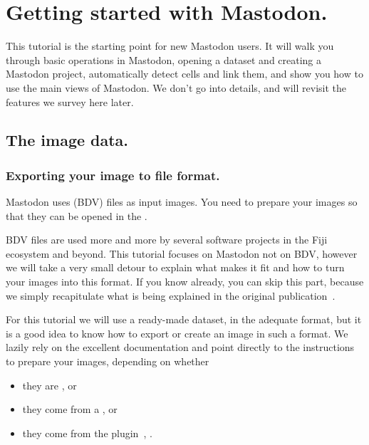 \section{Getting started with Mastodon.}

This tutorial is the starting point for new Mastodon users. 
It will walk you through basic operations in Mastodon, opening a dataset and creating a Mastodon project, automatically detect cells and link them, and show you how to use the main views of Mastodon.
We don't go into details, and will revisit the features we survey here later.

\subsection{The image data.}

\subsubsection{Exporting your image to \Bdv file format.}

Mastodon uses  (BDV) files as input images.
You need to prepare your images so that they can be opened in the \bdv.

BDV files are used more and more by several software projects in the Fiji ecosystem and beyond. 
This tutorial focuses on Mastodon not on BDV, however we will take a very small detour to explain what makes it fit and how to turn your images into this format. 
If you know already, you can skip this part, because we simply recapitulate what is being explained in the original \Bdv publication~\cite{bdv}.

For this tutorial we will use a ready-made dataset, in the adequate format, but it is a good idea to know how to export or create an image in such a format.
We lazily rely on the excellent \bdv documentation and point directly to the \bdv instructions to prepare your images, \eg depending on whether
\begin{itemize}
	\item they are , or
	\item they come from a , or
	\item they come from the  plugin~\cite{BigStitcher}, \etc.
\end{itemize}

